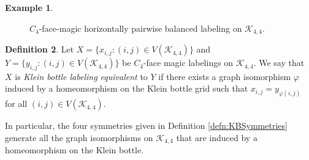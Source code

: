 \documentclass[10pt, reqno]{amsart}
\theoremstyle{definition}
\newtheorem{definition}{Definition}
\newtheorem{example}[definition]{Example}
\theoremstyle{plain}
\begin{document}
\begin{example}
\begin{figure}[hbt!]
\caption{$C_4$-face-magic horizontally pairwise balanced 
labeling on $\mathcal{K}_{4,4}$.} 
\label{fig:PairVerticalExample}
\end{figure}
\end{example}




\begin{definition}
Let $X=\{ x_{i,j} : (i,j) \in V(\mathcal{K}_{4,4})\}$ 
and  $Y=\{ y_{i,j} : (i,j) \in V(\mathcal{K}_{4,4})\}$ 
be $C_4$-face magic labelings on $\mathcal{K}_{4,4}$. 
We say that $X$ is \textit{Klein bottle labeling 
equivalent} to $Y$ if there exists a graph isomorphism 
$\varphi$ induced by a homeomorphism on the Klein bottle 
grid such that $x_{i,j}=y_{\varphi(i,j)}$ for all 
$(i,j)\in V(\mathcal{K}_{4,4})$.
\end{definition}

In particular, the four symmetries given in Definition
\ref{defn:KBSymmetries} generate all the 
graph isomorphisms on $\mathcal{K}_{4,4}$ that are 
induced by a homeomorphism on the Klein bottle.
\end{document}
